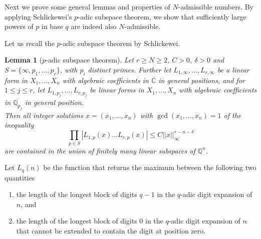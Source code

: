 \documentclass[12pt]{amsart}
\renewcommand{\leq}{\leqslant}
\renewcommand{\geq}{\geqslant}
\newtheorem{lemma}[theorem]{Lemma}
\theoremstyle{definition}
\numberwithin{equation}{section}
\newcommand\CC{\mathbb{C}}
\newcommand\QQ{\mathbb{Q}}
\numberwithin{equation}{section}
\begin{document}
Next we prove some general lemmas and properties of $N$-admissible numbers. By applying Schlickewei's $p$-adic subspace theorem, we show that sufficiently large powers of $p$ in base $q$ are indeed also $N$-admissible.

Let us recall the $p$-adic subspace theorem by Schlickewei.
\begin{lemma}[$p$-adic subspace theorem]\label{p-adic-Subspace}
    Let $r\geq N\geq 2$, $C>0$, $\delta>0$ and $S=\{\infty,p_1,\dots,p_r\}$, with $p_i$ distinct primes. Further let $L_{1,\infty},\dots, L_{r,\infty}$ be a linear form in $X_1, \dots, X_n$ with algebraic coefficients in $\CC$ in general positions, and for $1\leq j\leq r$, let $L_{1,p_j},\dots, L_{r,p_j}$ be linear forms in $X_1,\dots, X_n$ with algebraic coefficients in $\overline{\QQ_{p_j}}$ in general position.\\
    Then all integer solutions $x=(x_1,\dots,x_n)$ with $\gcd(x_1,\dots,x_n)=1$ of the inequality
    \[
        \prod_{p\in S}\left|L_{1,p}(x)\dots L_{r,p}(x)\right|\leq C \left|\left| x \right|\right|_{\infty}^{r-n-\delta}
    \]
    are contained in the union of finitely many linear subspaces of $\QQ^n$.
\end{lemma}

Let $L_q(n)$ be the function that returns the maximum between the following two quantities
\begin{enumerate}
	\item the length of the longest block of digits $\mathrel{{q}{-}{1}}$ in the $q$-adic digit expansion of $n$, and
	\item the length of the longest block of digits $0$ in the $q$-adic digit expansion of $n$ that cannot be extended to contain the digit at position zero.
\end{enumerate} 
\end{document}
